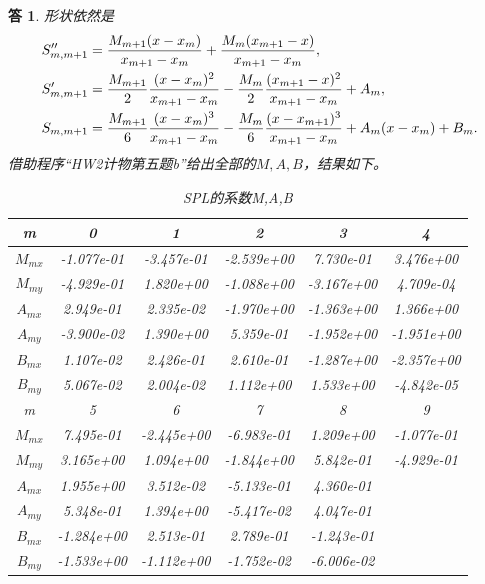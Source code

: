\documentclass[10pt]{ctexart}
\newtheorem*{answer}{答}
\begin{document}
\begin{answer}
    形状依然是
    \begin{align}
        S_{m,m+1}''&=\frac{M_{m+1}(x-x_m)}{x_{m+1}-x_m}+\frac{M_{m}(x_{m+1}-x)}{x_{m+1}-x_m},\notag\\
        S_{m,m+1}'&=\frac{M_{m+1}}{2}\frac{(x-x_m)^2}{x_{m+1}-x_m}-\frac{M_{m}}{2}\frac{(x_{m+1}-x)^2}{x_{m+1}-x_{m}}+A_m,\notag\\
        S_{m,m+1}&=\frac{M_{m+1}}{6}\frac{(x-x_m)^3}{x_{m+1}-x_m}-\frac{M_{m}}{6}\frac{(x-x_{m+1})^3}{x_{m+1}-x_{m}}+A_m(x-x_m)+B_m.\notag
    \end{align}
    借助程序“HW2计物第五题b”给出全部的$M,A,B$，结果如下。
    \begin{table}[H]
        \centering
        \begin{tabular}{cccccc}
            \toprule
            m & 0 & 1 & 2 & 3 & 4 \\
            \midrule
            $ M_{mx}$& -1.077e-01 & -3.457e-01 & -2.539e+00 & 7.730e-01 & 3.476e+00\\
            $ M_{my}$& -4.929e-01 & 1.820e+00 & -1.088e+00 & -3.167e+00 & 4.709e-04\\
            $ A_{mx}$& 2.949e-01 & 2.335e-02 & -1.970e+00 & -1.363e+00 & 1.366e+00\\
            $ A_{my}$& -3.900e-02 & 1.390e+00 & 5.359e-01 & -1.952e+00 & -1.951e+00\\
            $ B_{mx}$& 1.107e-02 & 2.426e-01 & 2.610e-01 & -1.287e+00 & -2.357e+00\\
            $ B_{my}$& 5.067e-02 & 2.004e-02 & 1.112e+00 & 1.533e+00 & -4.842e-05\\
            \bottomrule
            \toprule
            m & 5 & 6 & 7 & 8 & 9\\
            \midrule
            $ M_{mx}$& 7.495e-01 & -2.445e+00 & -6.983e-01 & 1.209e+00 & -1.077e-01\\
            $ M_{my}$& 3.165e+00 & 1.094e+00 & -1.844e+00 & 5.842e-01 & -4.929e-01\\
            $ A_{mx}$&1.955e+00 & 3.512e-02 & -5.133e-01 & 4.360e-01 & \\
            $ A_{my}$&5.348e-01 & 1.394e+00 & -5.417e-02 & 4.047e-01 & \\
            $ B_{mx}$& -1.284e+00 & 2.513e-01 & 2.789e-01 & -1.243e-01 & \\
            $ B_{my}$& -1.533e+00 & -1.112e+00 & -1.752e-02 & -6.006e-02 & \\
            \bottomrule
        \end{tabular}
        \caption{SPL的系数M,A,B}
    \end{table}
\end{answer}
\end{document}
